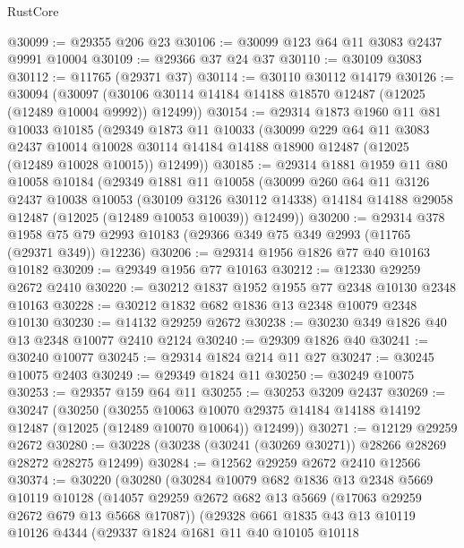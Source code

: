 \begin{lexlean}{RustCore}
\begin{coremodule}
@30099 := @29355 @206 @23
@30106 := @30099 @123 @64 @11 @3083 @2437 @9991 @10004
@30109 := @29366 @37 @24 @37
@30110 := @30109 @3083
@30112 := @11765 (@29371 @37)
@30114 := @30110 @30112 @14179
@30126 := @30094
    (@30097 (@30106 @30114 @14184 @14188 @18570 @12487 (@12025 (@12489 @10004 @9992)) @12499))
@30154 := @29314
    @1873
    @1960
    @11
    @81
    @10033
    @10185
    (@29349
      @1873
      @11
      @10033
      (@30099
        @229
        @64
        @11
        @3083
        @2437
        @10014
        @10028
        @30114
        @14184
        @14188
        @18900
        @12487
        (@12025 (@12489 @10028 @10015))
        @12499))
@30185 := @29314
    @1881
    @1959
    @11
    @80
    @10058
    @10184
    (@29349
      @1881
      @11
      @10058
      (@30099
        @260
        @64
        @11
        @3126
        @2437
        @10038
        @10053
        (@30109 @3126 @30112 @14338)
        @14184
        @14188
        @29058
        @12487
        (@12025 (@12489 @10053 @10039))
        @12499))
@30200 := @29314
    @378
    @1958
    @75
    @79
    @2993
    @10183
    (@29366 @349 @75 @349 @2993 (@11765 (@29371 @349)) @12236)
@30206 := @29314 @1956 @1826 @77 @40 @10163 @10182
@30209 := @29349 @1956 @77 @10163
@30212 := @12330 @29259 @2672 @2410
@30220 := @30212 @1837 @1952 @1955 @77 @2348 @10130 @2348 @10163
@30228 := @30212 @1832 @682 @1836 @13 @2348 @10079 @2348 @10130
@30230 := @14132 @29259 @2672
@30238 := @30230 @349 @1826 @40 @13 @2348 @10077 @2410 @2124
@30240 := @29309 @1826 @40
@30241 := @30240 @10077
@30245 := @29314 @1824 @214 @11 @27
@30247 := @30245 @10075 @2403
@30249 := @29349 @1824 @11
@30250 := @30249 @10075
@30253 := @29357 @159 @64 @11
@30255 := @30253 @3209 @2437
@30269 := @30247
    (@30250
      (@30255
        @10063
        @10070
        @29375
        @14184
        @14188
        @14192
        @12487
        (@12025 (@12489 @10070 @10064))
        @12499))
@30271 := @12129 @29259 @2672
@30280 := @30228 (@30238 (@30241 (@30269 @30271)) @28266 @28269 @28272 @28275 @12499)
@30284 := @12562 @29259 @2672 @2410 @12566
@30374 := @30220
    (@30280
      (@30284
        @10079
        @682
        @1836
        @13
        @2348
        @5669
        @10119
        @10128
        (@14057 @29259 @2672 @682 @13 @5669 (@17063 @29259 @2672 @679 @13 @5668 @17087))
        (@29328
          @661
          @1835
          @43
          @13
          @10119
          @10126
          @4344
          (@29337
            @1824
            @1681
            @11
            @40
            @10105
            @10118

\end{coremodule}
\end{lexlean}
